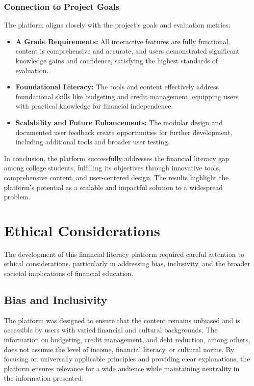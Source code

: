 \documentclass[11pt,twocolumn]{article}
\begin{document}
\subsubsection{Connection to Project Goals}
The platform aligns closely with the project’s goals and evaluation metrics:
\begin{itemize}
    \item \textbf{A Grade Requirements:} All interactive features are fully functional, content is comprehensive and accurate, and users demonstrated significant knowledge gains and confidence, satisfying the highest standards of evaluation.
    \item \textbf{Foundational Literacy:} The tools and content effectively address foundational skills like budgeting and credit management, equipping users with practical knowledge for financial independence.
    \item \textbf{Scalability and Future Enhancements:} The modular design and documented user feedback create opportunities for further development, including additional tools and broader user testing.
\end{itemize}

In conclusion, the platform successfully addresses the financial literacy gap among college students, fulfilling its objectives through innovative tools, comprehensive content, and user-centered design. The results highlight the platform’s potential as a scalable and impactful solution to a widespread problem.

\section{Ethical Considerations}

The development of this financial literacy platform required careful attention to ethical considerations, particularly in addressing bias, inclusivity, and the broader societal implications of financial education.

\subsection{Bias and Inclusivity}
The platform was designed to ensure that the content remains unbiased and is accessible by users with varied financial and cultural backgrounds. The information on budgeting, credit management, and debt reduction, among others, does not assume the level of income, financial literacy, or cultural norms. By focusing on universally applicable principles and providing clear explanations, the platform ensures relevance for a wide audience while maintaining neutrality in the information presented.
\end{document}
